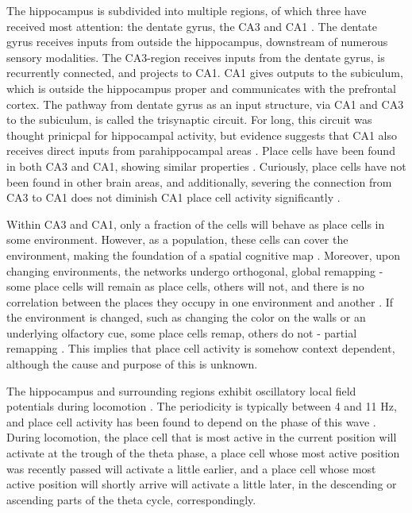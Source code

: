 \documentclass{article}
\begin{document}
    The hippocampus is subdivided into multiple regions, of which three have received most attention: the dentate gyrus, the CA3 and CA1 \parencite{Cherubini2015}. The dentate gyrus receives inputs from outside the hippocampus, downstream of numerous sensory modalities. The CA3-region receives inputs from the dentate gyrus, is recurrently connected, and projects to CA1. CA1 gives outputs to the subiculum, which is outside the hippocampus proper and communicates with the prefrontal cortex. The pathway from dentate gyrus as an input structure, via CA1 and CA3 to the subiculum, is called the trisynaptic circuit. For long, this circuit was thought prinicpal for hippocampal activity, but evidence suggests that CA1 also receives direct inputs from parahippocampal areas \parencite{Kerr2007}. Place cells have been found in both CA3 and CA1, showing similar properties \parencite{Dong2021}. Curiously, place cells have not been found in other brain areas, and additionally, severing the connection from CA3 to CA1 does not diminish CA1 place cell activity significantly \parencite{Brun2002}.

    Within CA3 and CA1, only a fraction of the cells will behave as place cells in some environment. However, as a population, these cells can cover the environment, making the foundation of a spatial cognitive map \parencite{Wilson1993}. Moreover, upon changing environments, the networks undergo orthogonal, global remapping - some place cells will remain as place cells, others will not, and there is no correlation between the places they occupy in one environment and another \parencite{Muller1987}. If the environment is changed, such as changing the color on the walls or an underlying olfactory cue, some place cells remap, others do not - partial remapping \parencite{Anderson2003}. This implies that place cell activity is somehow context dependent, although the cause and purpose of this is unknown.

    The hippocampus and surrounding regions exhibit oscillatory local field potentials during locomotion \parencite{Winson1978}. The periodicity is typically between 4 and 11 Hz, and place cell activity has been found to depend on the phase of this wave \parencite{OKeefe1993,Skaggs1996, Hafting2008}. During locomotion, the place cell that is most active in the current position will activate at the trough of the theta phase, a place cell whose most active position was recently passed will activate a little earlier, and a place cell whose most active position will shortly arrive will activate a little later, in the descending or ascending parts of the theta cycle, correspondingly.
\end{document}
